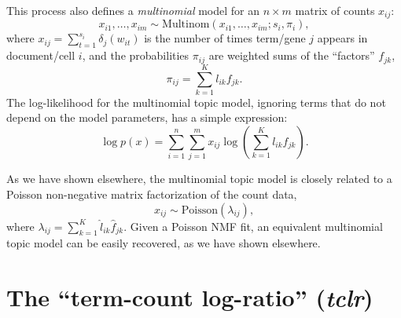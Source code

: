 \documentclass[final]{siamart171218}
\begin{document}
This process also defines a {\em multinomial} model for an $n \times
m$ matrix of counts $x_{ij}$:
\begin{equation}
x_{i1}, \ldots, x_{im} \sim
\mathrm{Multinom}(x_{i1}, \ldots, x_{im}; s_i, \pi_i),
\end{equation}
where $x_{ij} = \sum_{t=1}^{s_i} \delta_j(w_{it})$ is the number of
times term/gene $j$ appears in document/cell $i$, and the
probabilities $\pi_{ij}$ are weighted sums of the ``factors''
$f_{jk}$,
\begin{equation}
\pi_{ij} = \sum_{k=1}^K l_{ik} f_{jk}.
\end{equation}
The log-likelihood for the multinomial topic model, ignoring terms
that do not depend on the model parameters, has a simple expression:
\begin{equation}
\log p(x) = \sum_{i=1}^n \sum_{j=1}^m
x_{ij} \log({\textstyle \sum_{k=1}^K l_{ik} f_{jk}}).
\end{equation}

As we have shown elsewhere, the multinomial topic model is closely
related to a Poisson non-negative matrix factorization of the count
data,
\begin{equation}
x_{ij} \sim \mathrm{Poisson}(\lambda_{ij}),
\end{equation}
where $\lambda_{ij} = \sum_{k=1}^K \hat{l}_{ik} \hat{f}_{jk}$. Given a
Poisson NMF fit, an equivalent multinomial topic model can be easily
recovered, as we have shown elsewhere.

\section{The ``term-count log-ratio'' ({\em tclr})}
\end{document}
